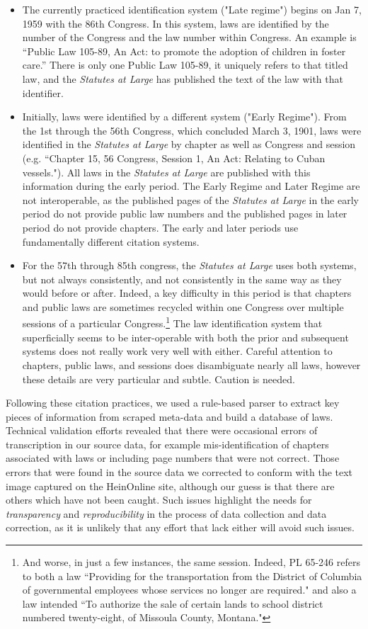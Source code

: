 \documentclass[fleqn,10pt]{wlscirep}
\begin{document}
\begin{itemize}
\item The currently practiced identification system ("Late regime") begins on Jan 7, 1959 with the 86th Congress. In this system, laws are identified by the number of the Congress and the law number within Congress. An example is ``Public Law 105-89, An Act: to promote the adoption of children in foster care.'' There is only one Public Law 105-89, it uniquely refers to that titled law, and the \emph{Statutes at Large} has published the text of the law with that identifier.
\item Initially, laws were identified by a different system ("Early Regime"). From the 1st through the 56th Congress, which concluded March 3, 1901, laws were identified in the \emph{Statutes at Large} by chapter as well as Congress and session (e.g. ``Chapter 15, 56 Congress, Session 1, An Act: Relating to Cuban vessels."). All laws in the \emph{Statutes at Large} are published with this information during the early period. The Early Regime and Later Regime are not interoperable, as the published pages of the \emph{Statutes at Large} in the early period do not provide public law numbers and the published pages in later period do not provide chapters. The early and later periods use fundamentally different citation systems.
\item For the 57th through 85th congress, the \emph{Statutes at Large} uses both systems, but not always consistently, and not consistently in the same way as they would before or after. Indeed, a key difficulty in this period is that chapters and public laws are sometimes recycled within one Congress over multiple sessions of a particular Congress.\footnote{And worse, in just a few instances, the same session. Indeed, PL 65-246 refers to both a law ``Providing for the transportation from the District of Columbia of governmental employees whose services no longer are required." and also a law intended ``To authorize the sale of certain lands to school district numbered twenty-eight, of Missoula County, Montana."} The law identification system that superficially seems to be inter-operable with both the prior and subsequent systems does not really work very well with either.  Careful attention to chapters, public laws, and sessions does disambiguate nearly all laws, however these details are very particular and subtle. Caution is needed.
\end{itemize}

 Following these citation practices, we used a rule-based parser to extract key pieces of information from scraped meta-data and build a database of laws. Technical validation efforts revealed that there were occasional errors of transcription in our source data, for example mis-identification of chapters associated with laws or including page numbers that were not correct. Those errors that were found in the source data we corrected to conform with the text image captured on the HeinOnline site, although our guess is that there are others which have not been caught. Such issues highlight the needs for \textit{transparency} and \textit{reproducibility} in the process of data collection and data correction, as it is unlikely that any effort that lack either will avoid such issues. 
 
\end{document}

